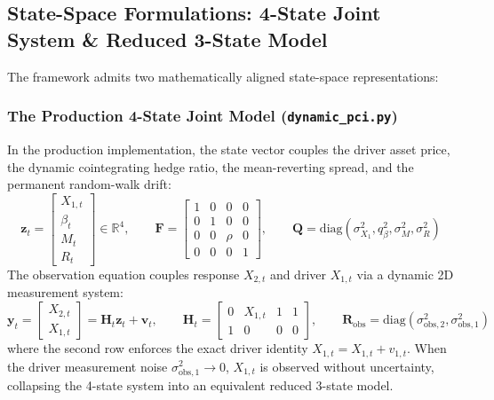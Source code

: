 \documentclass[11pt, a4paper]{article}
\begin{document}
\subsection{State-Space Formulations: 4-State Joint System \& Reduced 3-State Model}
The framework admits two mathematically aligned state-space representations:

\subsubsection{The Production 4-State Joint Model (\texttt{dynamic\_pci.py})}
In the production implementation, the state vector couples the driver asset price, the dynamic cointegrating hedge ratio, the mean-reverting spread, and the permanent random-walk drift:
\begin{equation}
    \mathbf{z}_t = \begin{bmatrix} X_{1,t} \\ \beta_t \\ M_t \\ R_t \end{bmatrix} \in \mathbb{R}^4, \qquad
    \mathbf{F} = \begin{bmatrix} 1 & 0 & 0 & 0 \\ 0 & 1 & 0 & 0 \\ 0 & 0 & \rho & 0 \\ 0 & 0 & 0 & 1 \end{bmatrix}, \qquad
    \mathbf{Q} = \text{diag}(\sigma_{X_1}^2, q_\beta^2, \sigma_M^2, \sigma_R^2)
\end{equation}
The observation equation couples response $X_{2,t}$ and driver $X_{1,t}$ via a dynamic 2D measurement system:
\begin{equation}
    \mathbf{y}_t = \begin{bmatrix} X_{2,t} \\ X_{1,t} \end{bmatrix} = \mathbf{H}_t \mathbf{z}_t + \mathbf{v}_t, \qquad
    \mathbf{H}_t = \begin{bmatrix} 0 & X_{1,t} & 1 & 1 \\ 1 & 0 & 0 & 0 \end{bmatrix}, \qquad
    \mathbf{R}_{\text{obs}} = \text{diag}(\sigma_{\text{obs}, 2}^2, \sigma_{\text{obs}, 1}^2)
\end{equation}
where the second row enforces the exact driver identity $X_{1,t} = X_{1,t} + v_{1,t}$. When the driver measurement noise $\sigma_{\text{obs}, 1}^2 \to 0$, $X_{1,t}$ is observed without uncertainty, collapsing the 4-state system into an equivalent reduced 3-state model.
\end{document}
